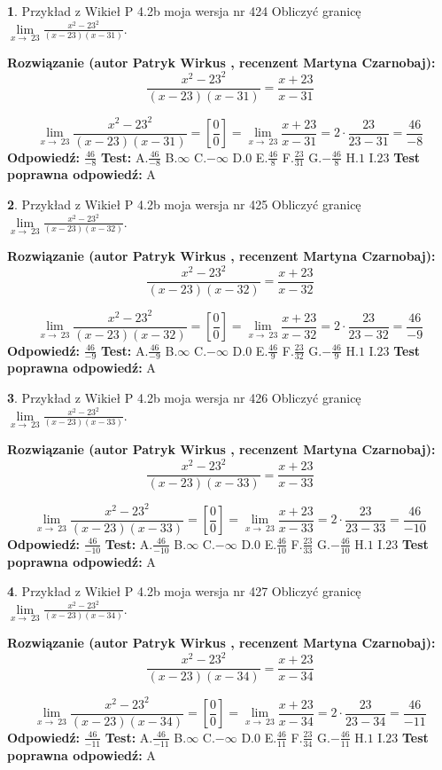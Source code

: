 \documentclass[12pt, a4paper]{article}
\theoremstyle{definition} %
\newtheorem{zad}{}
\newcommand{\zadStart}[1]{\begin{zad}#1\newline}
\newcommand{\zadStop}{\end{zad}}
\newcommand{\rozwStart}[2]{\noindent \textbf{Rozwiązanie (autor #1 , recenzent #2): }\newline}
\newcommand{\rozwStop}{\newline}
\newcommand{\odpStart}{\noindent \textbf{Odpowiedź:}\newline}
\newcommand{\odpStop}{\newline}
\newcommand{\testStart}{\noindent \textbf{Test:}\newline}
\newcommand{\testStop}{\newline}
\newcommand{\kluczStart}{\noindent \textbf{Test poprawna odpowiedź:}\newline}
\newcommand{\kluczStop}{\newline}
\begin{document}
\zadStart{Przykład z Wikieł P 4.2b moja wersja nr 424}
Obliczyć granicę $\lim\limits_{x\to\ 23}\frac{x^{2}-23^{2}}{(x-23)(x-31)}$.
\zadStop
\rozwStart{Patryk Wirkus}{Martyna Czarnobaj}
$$\frac{x^{2}-23^{2}}{(x-23)(x-31)}=\frac{x+23}{x-31}$$

$$\lim\limits_{x\to\ 23}\frac{x^{2}-23^{2}}{(x-23)(x-31)}=[\frac{0}{0}]=\lim\limits_{x\to\ 23}\frac{x+23}{x-31}=2 \cdot \frac{23}{23-31} = \frac{46}{-8}$$
\rozwStop
\odpStart
$\frac{46}{-8}$
\odpStop
\testStart
A.$\frac{46}{-8}$
B.$\infty$
C.$-\infty$
D.$0$
E.$\frac{46}{8}$
F.$\frac{23}{31}$
G.$-\frac{46}{8}$
H.$1$
I.$23$
\testStop
\kluczStart
A
\kluczStop



\zadStart{Przykład z Wikieł P 4.2b moja wersja nr 425}
Obliczyć granicę $\lim\limits_{x\to\ 23}\frac{x^{2}-23^{2}}{(x-23)(x-32)}$.
\zadStop
\rozwStart{Patryk Wirkus}{Martyna Czarnobaj}
$$\frac{x^{2}-23^{2}}{(x-23)(x-32)}=\frac{x+23}{x-32}$$

$$\lim\limits_{x\to\ 23}\frac{x^{2}-23^{2}}{(x-23)(x-32)}=[\frac{0}{0}]=\lim\limits_{x\to\ 23}\frac{x+23}{x-32}=2 \cdot \frac{23}{23-32} = \frac{46}{-9}$$
\rozwStop
\odpStart
$\frac{46}{-9}$
\odpStop
\testStart
A.$\frac{46}{-9}$
B.$\infty$
C.$-\infty$
D.$0$
E.$\frac{46}{9}$
F.$\frac{23}{32}$
G.$-\frac{46}{9}$
H.$1$
I.$23$
\testStop
\kluczStart
A
\kluczStop



\zadStart{Przykład z Wikieł P 4.2b moja wersja nr 426}
Obliczyć granicę $\lim\limits_{x\to\ 23}\frac{x^{2}-23^{2}}{(x-23)(x-33)}$.
\zadStop
\rozwStart{Patryk Wirkus}{Martyna Czarnobaj}
$$\frac{x^{2}-23^{2}}{(x-23)(x-33)}=\frac{x+23}{x-33}$$

$$\lim\limits_{x\to\ 23}\frac{x^{2}-23^{2}}{(x-23)(x-33)}=[\frac{0}{0}]=\lim\limits_{x\to\ 23}\frac{x+23}{x-33}=2 \cdot \frac{23}{23-33} = \frac{46}{-10}$$
\rozwStop
\odpStart
$\frac{46}{-10}$
\odpStop
\testStart
A.$\frac{46}{-10}$
B.$\infty$
C.$-\infty$
D.$0$
E.$\frac{46}{10}$
F.$\frac{23}{33}$
G.$-\frac{46}{10}$
H.$1$
I.$23$
\testStop
\kluczStart
A
\kluczStop



\zadStart{Przykład z Wikieł P 4.2b moja wersja nr 427}
Obliczyć granicę $\lim\limits_{x\to\ 23}\frac{x^{2}-23^{2}}{(x-23)(x-34)}$.
\zadStop
\rozwStart{Patryk Wirkus}{Martyna Czarnobaj}
$$\frac{x^{2}-23^{2}}{(x-23)(x-34)}=\frac{x+23}{x-34}$$

$$\lim\limits_{x\to\ 23}\frac{x^{2}-23^{2}}{(x-23)(x-34)}=[\frac{0}{0}]=\lim\limits_{x\to\ 23}\frac{x+23}{x-34}=2 \cdot \frac{23}{23-34} = \frac{46}{-11}$$
\rozwStop
\odpStart
$\frac{46}{-11}$
\odpStop
\testStart
A.$\frac{46}{-11}$
B.$\infty$
C.$-\infty$
D.$0$
E.$\frac{46}{11}$
F.$\frac{23}{34}$
G.$-\frac{46}{11}$
H.$1$
I.$23$
\testStop
\kluczStart
A
\kluczStop
\end{document}
